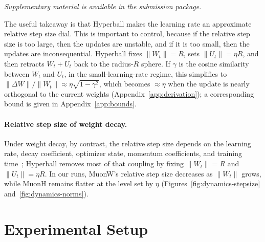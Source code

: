\documentclass{article}
\makeatletter
\newcommand{\supplementarylinknote}{%
  \if@anonymous\relax\else
    \noindent\emph{Supplementary material is available in the submission package.}%
  \fi
}
\makeatother
\begin{document}
\supplementarylinknote

\medskip

The useful takeaway is that Hyperball makes the learning rate an approximate relative step size dial. This is important to control, because if the relative step size is too large, then the updates are unstable, and if it is too small, then the updates are inconsequential. Hyperball fixes $\|W_t\|=R$, sets $\|U_t\|=\eta R$, and then retracts $W_t+U_t$ back to the radius-$R$ sphere. If $\gamma$ is the cosine similarity between $W_t$ and $U_t$, in the small-learning-rate regime, this simplifies to $\|\Delta W\|/\|W_t\|\approx \eta\sqrt{1-\gamma^2}$, which becomes $\approx\eta$ when the update is nearly orthogonal to the current weights (Appendix~\ref{app:derivation}); a corresponding bound is given in Appendix~\ref{app:bounds}.

\paragraph{Relative step size of weight decay.} Under weight decay, by contrast, the relative step size depends on the learning rate, decay coefficient, optimizer state, momentum coefficients, and training time~\citep{wdeq,hyperball,wdnorm}; Hyperball removes most of that coupling by fixing $\|W_t\|=R$ and $\|U_t\|=\eta R$. In our runs, MuonW's relative step size decreases as $\|W_t\|$ grows, while MuonH remains flatter at the level set by $\eta$ (Figures~\ref{fig:dynamics-stepsize} and~\ref{fig:dynamics-norms}).


\section{Experimental Setup}
\label{sec:experimental-setup}
\end{document}
